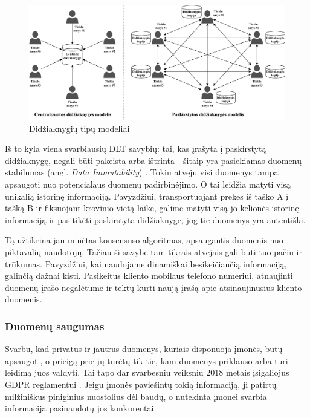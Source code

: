 \begin{figure}[H]
    \centering
    \includegraphics[scale=0.65]{images/ledger-model-types}
    \caption{Didžiaknygių tipų modeliai}
\end{figure}

Iš to kyla viena svarbiausių DLT savybių: tai, kas įrašyta į paskirstytą didžiaknygę, negali būti pakeista arba ištrinta - šitaip yra pasiekiamas duomenų stabilumas (angl. \textit{Data Immutability}) \cite{xu2017dl}. Tokiu atveju visi duomenys tampa apsaugoti nuo potencialaus duomenų padirbinėjimo. O tai leidžia matyti visą unikalią istorinę informaciją. Pavyzdžiui, transportuojant prekes iš taško A į tašką B ir fiksuojant krovinio vietą laike, galime matyti visą jo kelionės istorinę informaciją ir pasitikėti paskirstyta didžiaknyge, jog tie duomenys yra autentiški. 

Tą užtikrina jau minėtas konsensuso algoritmas, apsaugantis duomenis nuo piktavalių naudotojų. Tačiau ši savybė tam tikrais atvejais gali būti tuo pačiu ir trūkumas. Pavyzdžiui, kai naudojame dinamiškai besikeičiančią informaciją, galinčią dažnai kisti. Pasikeitus kliento mobilaus telefono numeriui, atnaujinti duomenų įrašo negalėtume ir tektų kurti naują įrašą apie atsinaujinusius kliento duomenis.




\subsubsection{Duomenų saugumas}

Svarbu, kad privatūs ir jautrūs duomenys, kuriais disponuoja įmonės, būtų apsaugoti, o prieigą prie jų turėtų tik tie, kam duomenys priklauso arba turi leidimą juos valdyti. Tai tapo dar svarbesniu veiksniu 2018 metais įsigaliojus GDPR reglamentui \cite{ferrari2018eu}. Jeigu įmonės paviešintų tokią informaciją, ji patirtų milžiniškus piniginius nuostolius dėl baudų, o nutekinta įmonei svarbia informacija pasinaudotų jos konkurentai.

